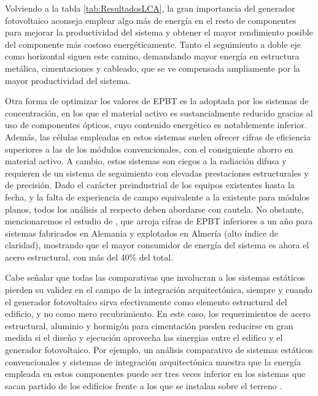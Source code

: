 Volviendo a la tabla \ref{tab:ResultadosLCA}, la gran importancia del
generador fotovoltaico aconseja emplear algo más de energía en el
resto de componentes para mejorar la productividad del sistema y
obtener el mayor rendimiento posible del componente más costoso
energéticamente. Tanto el seguimiento a doble eje como horizontal
siguen este camino, demandando mayor energía en estructura metálica,
cimentaciones y cableado, que se ve compensada ampliamente por la
mayor productividad del sistema. 

Otra forma de optimizar los valores de EPBT es la adoptada por los
sistemas de concentración, en los que el material activo es
sustancialmente reducido gracias al uso de componentes ópticos, cuyo
contenido energético es notablemente inferior. Además, las células
empleadas en estos sistemas suelen ofrecer cifras de eficiencia
superiores a las de los módulos convencionales, con el consiguiente
ahorro en material activo. A cambio, estos sistemas son ciegos a la
radiación difusa y requieren de un sistema de seguimiento con elevadas
prestaciones estructurales y de precisión. Dado el carácter
preindustrial de los equipos existentes hasta la fecha, y la falta de
experiencia de campo equivalente a la existente para módulos planos,
todos los análisis al respecto deben abordarse con cautela.  No
obstante, mencionaremos el estudio de \cite{Peharz.Dimroth2005}, que
arroja cifras de EPBT inferiores a un año para sistemas fabricados en
Alemania y explotados en Almería (alto índice de claridad), mostrando
que el mayor consumidor de energía del sistema es ahora el acero
estructural, con más del 40\% del total.

Cabe señalar que todas las comparativas que involucran a los sistemas
estáticos pierden su validez en el campo de la integración arquitectónica,
siempre y cuando el generador fotovoltaico sirva efectivamente como
elemento estructural del edificio, y no como mero recubrimiento. En
este caso, los requerimientos de acero estructural, aluminio y hormigón
para cimentación pueden reducirse en gran medida si el diseño y ejecución
aprovecha las sinergias entre el edifico y el generador fotovoltaico.
Por ejemplo, un análisis comparativo de sistemas estáticos convencionales
y sistemas de integración arquitectónica muestra que la energía empleada
en estos componentes puede ser tres veces inferior en los sistemas
que sacan partido de los edificios frente a los que se instalan sobre
el terreno \cite{Frankl.Masini.ea1998}.



